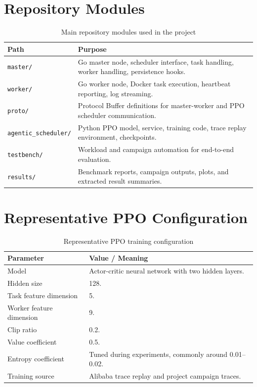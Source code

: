 \section{Repository Modules}

\begin{table}[H]
\centering
\caption{Main repository modules used in the project}
\label{tab:repo_modules}
\begin{tabularx}{\textwidth}{lX}
\toprule
\textbf{Path} & \textbf{Purpose} \\
\midrule
\texttt{master/} & Go master node, scheduler interface, task handling, worker handling, persistence hooks. \\
\texttt{worker/} & Go worker node, Docker task execution, heartbeat reporting, log streaming. \\
\texttt{proto/} & Protocol Buffer definitions for master-worker and PPO scheduler communication. \\
\texttt{agentic\_scheduler/} & Python PPO model, service, training code, trace replay environment, checkpoints. \\
\texttt{testbench/} & Workload and campaign automation for end-to-end evaluation. \\
\texttt{results/} & Benchmark reports, campaign outputs, plots, and extracted result summaries. \\
\bottomrule
\end{tabularx}
\end{table}

\section{Representative PPO Configuration}

\begin{table}[H]
\centering
\caption{Representative PPO training configuration}
\label{tab:ppo_config}
\begin{tabularx}{\textwidth}{lX}
\toprule
\textbf{Parameter} & \textbf{Value / Meaning} \\
\midrule
Model & Actor-critic neural network with two hidden layers. \\
Hidden size & 128. \\
Task feature dimension & 5. \\
Worker feature dimension & 9. \\
Clip ratio & 0.2. \\
Value coefficient & 0.5. \\
Entropy coefficient & Tuned during experiments, commonly around 0.01--0.02. \\
Training source & Alibaba trace replay and project campaign traces. \\
\bottomrule
\end{tabularx}
\end{table}

